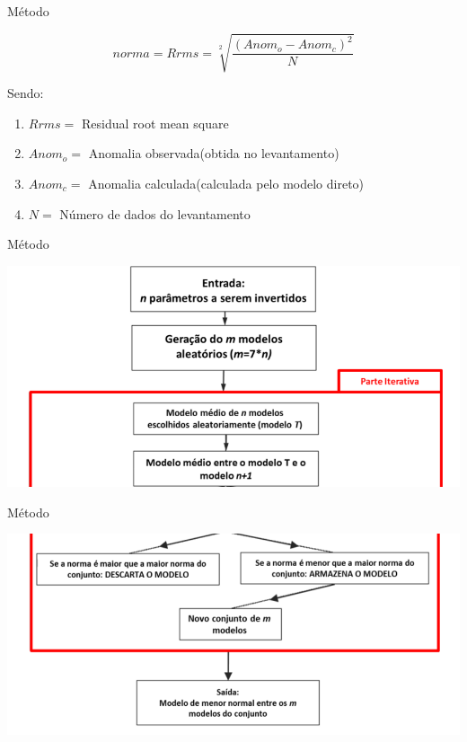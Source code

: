 \documentclass{beamer}
\begin{document}
\begin{frame}{Método}

\begin{equation}
norma = Rrms = \sqrt[2]{\frac{(Anom_{o} - Anom_{c})^2}{N}}  
\end{equation}

Sendo:
\begin{enumerate}
\item $Rrms =$ Residual root mean square
\item $Anom_{o} =$ Anomalia observada(obtida no levantamento)
\item $Anom_{c} =$ Anomalia calculada(calculada pelo modelo direto)
\item $N =$ Número de dados do levantamento
\end{enumerate}

\end{frame}

\begin{frame}{Método}
\begin{center}
\includegraphics[scale=0.35]{esquema1}
\end{center}
\end{frame}

\begin{frame}{Método}
\begin{center}
\includegraphics[scale=0.35]{esquema2}
\end{center}
\end{frame}
\end{document}
